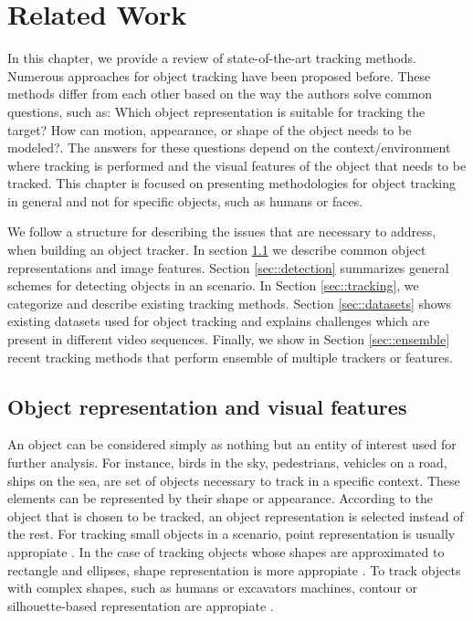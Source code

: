 \chapter{Related Work} %

\label{chapter::related_work} %


In this chapter, we provide a review of state-of-the-art tracking methods.
Numerous approaches for object tracking have been proposed before. These methods
differ from each other based on the way the authors solve common questions, such
as: Which object representation is suitable for tracking the target? How can
motion, appearance, or shape of the object needs to be modeled?. The answers 
for these questions depend on the context/environment where tracking is
performed and the visual features of the object that needs to be tracked. This
chapter is focused on presenting methodologies for object tracking in general
and not for specific objects, such as humans or faces.

We follow a structure for describing the issues that are necessary to address,
when building an object tracker. In section \ref{sec::object_representation} we
describe common object representations and image features. Section
\ref{sec::detection} summarizes general schemes for detecting objects in an
scenario. In Section \ref{sec::tracking}, we categorize and describe
existing tracking methods. Section \ref{sec::datasets} shows existing
datasets used for object tracking and explains challenges which are present
in different video sequences. Finally, we show in Section \ref{sec::ensemble}
recent tracking methods that perform ensemble of multiple trackers or features.

\section{Object representation and visual features}
\label{sec::object_representation}

An object can be considered simply as nothing but an entity of interest used for
further analysis. For instance, birds in the sky, pedestrians, vehicles on a
road, ships on the sea, are set of objects necessary to track in a specific
context. These elements can be represented by their shape or appearance.
According to the object that is chosen to be tracked, an object representation
is selected instead of the rest. For tracking small objects
in a scenario, point representation is usually appropiate
\cite{Veenman2001,Shafique2005}. In the case of tracking objects whose shapes
are approximated to rectangle and ellipses, shape representation is more
appropiate \cite{Comaniciu2003a}. To track objects with complex shapes, such
as humans or excavators machines, contour or silhouette-based representation are
appropiate \cite{Haritaoglu2000}.

